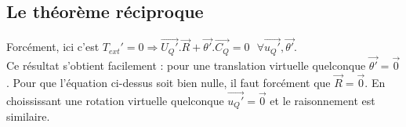 	\subsection{Le théorème réciproque}
	Forcément, ici c'est $T_{ext}' = 0 \Rightarrow \vec{U_Q'}.\vec{R} + 
	\vec{\theta'}.\vec{C_Q} = 0\ \ \ \forall \vec{u_Q'},\vec{\theta'}$.\\
	Ce résultat s'obtient facilement : pour une translation virtuelle 
	quelconque $\vec{\theta'}=\vec 0$. Pour que l'équation ci-dessus soit bien nulle,
	il faut forcément que $\vec{R}=\vec{0}$. En choississant une rotation
	virtuelle quelconque $\vec{u_Q'}=\vec{0}$ et le raisonnement est similaire.
	
	
	
	
	
	
	
	
	
	
	
	
	
	
	
	
	
	
	
	
	
	
